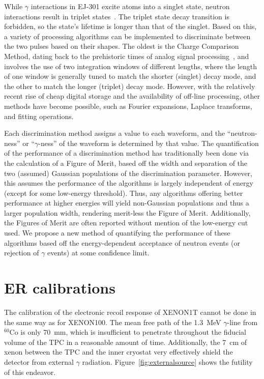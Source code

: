 \documentclass[phys,dissertation]{puthesis}
\begin{document}
While $\gamma$ interactions in EJ-301 excite atoms into a singlet state, neutron interactions result in triplet states~\cite{Kuchnir1968}. The triplet state decay transition is forbidden, so the state's lifetime is longer than that of the singlet. Based on this, a variety of processing algorithms can be implemented to discriminate between the two pulses based on their shapes. The oldest is the Charge Comparison Method, dating back to the prehistoric times of analog signal processing~\cite{Brooks1959}, and involves the use of two integration windows of different lengths, where the length of one window is generally tuned to match the shorter (singlet) decay mode, and the other to match the longer (triplet) decay mode. However, with the relatively recent rise of cheap digital storage and the availability of off-line processing, other methods have become possible, such as Fourier expansions, Laplace transforms, and fitting operations.

Each discrimination method assigns a value to each waveform, and the ``neutron-ness'' or ``$\gamma$-ness'' of the waveform is determined by that value. The quantification of the performance of a discrimination method has traditionally been done via the calculation of a Figure of Merit, based off the width and separation of the two (assumed) Gaussian populations of the discrimination parameter. However, this assumes the performance of the algorithms is largely independent of energy (except for some low-energy threshold). Thus, any algorithms offering better performance at higher energies will yield non-Gaussian populations and thus a larger population width, rendering merit-less the Figure of Merit. Additionally, the Figures of Merit are often reported without mention of the low-energy cut used. We propose a new method of quantifying the performance of these algorithms based off the energy-dependent acceptance of neutron events (or rejection of $\gamma$ events) at some confidence limit.

\section{ER calibrations}

The calibration of the electronic recoil response of XENON1T cannot be done in the same way as for XENON100. The mean free path of the 1.3~MeV $\gamma$-line from $^{60}$Co is only 70~mm, which is insufficient to penetrate throughout the fiducial volume of the TPC in a reasonable amount of time. Additionally, the 7~cm of xenon between the TPC and the inner cryostat very effectively shield the detector from external $\gamma$ radiation. Figure~\ref{fig:externalsource} shows the futility of this endeavor.
\end{document}
